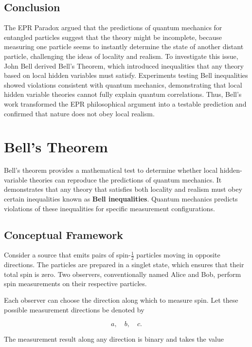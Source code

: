 \documentclass[14pt,a4paper]{extarticle}
\begin{document}
\subsection{Conclusion}

The EPR Paradox argued that the predictions of quantum mechanics for entangled particles suggest that the theory might be incomplete, because measuring one particle seems to instantly determine the state of another distant particle, challenging the ideas of locality and realism. To investigate this issue, John Bell derived Bell's Theorem, which introduced inequalities that any theory based on local hidden variables must satisfy. Experiments testing Bell inequalities showed violations consistent with quantum mechanics, demonstrating that local hidden variable theories cannot fully explain quantum correlations. Thus, Bell’s work transformed the EPR philosophical argument into a testable prediction and confirmed that nature does not obey local realism.

\section{Bell's Theorem}

Bell’s theorem provides a mathematical test to determine whether local hidden-variable theories can reproduce the predictions of quantum mechanics. It demonstrates that any theory that satisfies both locality and realism must obey certain inequalities known as \textbf{Bell inequalities}. Quantum mechanics predicts violations of these inequalities for specific measurement configurations.


\subsection{Conceptual Framework}

Consider a source that emits pairs of spin-$\frac{1}{2}$ particles moving in opposite directions. The particles are prepared in a singlet state, which ensures that their total spin is zero. Two observers, conventionally named Alice and Bob, perform spin measurements on their respective particles.

Each observer can choose the direction along which to measure spin. Let these possible measurement directions be denoted by

\[
a, \quad b, \quad c.
\]

The measurement result along any direction is binary and takes the value
\end{document}
